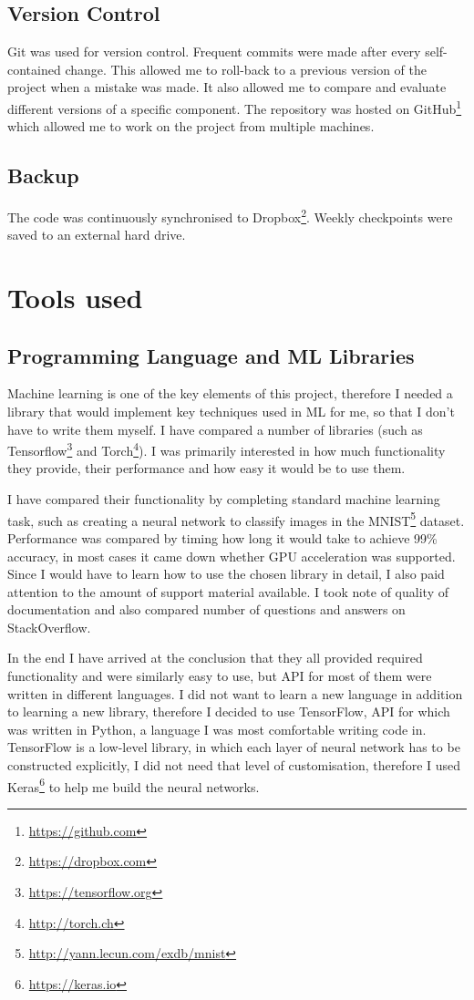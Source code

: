 \documentclass[12pt,a4paper]{book}
\begin{document}
\subsection{Version Control}
Git was used for version control.
Frequent commits were made after every self-contained change.
This allowed me to roll-back to a previous version of the project when a mistake was made.
It also allowed me to compare and evaluate different versions of a specific component.
The repository was hosted on GitHub\footnote{\url{https://github.com}} which allowed me to work on the project from multiple machines.
\subsection{Backup}
The code was continuously synchronised to Dropbox\footnote{\url{https://dropbox.com}}.
Weekly checkpoints were saved to an external hard drive.
\section{Tools used}
\subsection{Programming Language and ML Libraries}
Machine learning is one of the key elements of this project, therefore I needed a library that would implement key techniques used in ML for me, so that I don't have to write them myself.
I have compared a number of libraries (such as Tensorflow\footnote{\url{https://tensorflow.org}} and Torch\footnote{\url{http://torch.ch}}).
I was primarily interested in how much functionality they provide, their performance and how easy it would be to use them.

I have compared their functionality by completing standard machine learning task, such as creating a neural network to classify images in the MNIST\footnote{\url{http://yann.lecun.com/exdb/mnist}} dataset.
Performance was compared by timing how long it would take to achieve 99\% accuracy, in most cases it came down whether GPU acceleration was supported.
Since I would have to learn how to use the chosen library in detail, I also paid attention to the amount of support material available.
I took note of quality of documentation and also compared number of questions and answers on StackOverflow.

In the end I have arrived at the conclusion that they all provided required functionality and were similarly easy to use, but API for most of them were written in different languages.
I did not want to learn a new language in addition to learning a new library, therefore I decided to use TensorFlow, API for which was written in Python, a language I was most comfortable writing code in.
TensorFlow is a low-level library, in which each layer of neural network has to be constructed explicitly, I did not need that level of customisation, therefore I used Keras\footnote{\url{https://keras.io}} to help me build the neural networks.
\end{document}
